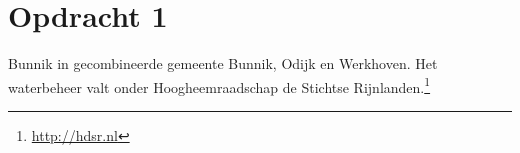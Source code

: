 

\section{Opdracht 1}

Bunnik in gecombineerde gemeente Bunnik, Odijk en Werkhoven.
Het waterbeheer valt onder Hoogheemraadschap de Stichtse Rijnlanden.\footnote{\url{http://hdsr.nl}}



